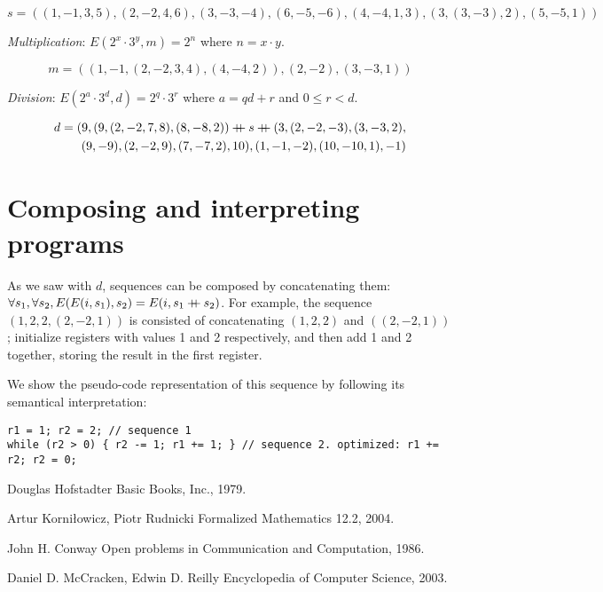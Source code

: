 \documentclass{article}
\newcommand\doubleplus{\mathbin{{+}\mspace{-8mu}{+}}}
\begin{document}
$$s = ((1, -1, 3, 5), (2, -2, 4, 6), (3, -3, -4), (6, -5, -6), (4, -4, 1, 3), (3, (3, -3), 2), (5, -5, 1))$$

\textit{Multiplication}: $E(2^x \cdot 3^y, m) = 2^n$ where $n = x \cdot y$.

$$m = ((1, -1, (2, -2, 3, 4), (4, -4, 2)), (2, -2), (3, -3, 1))$$

\textit{Division}: $E(2^a \cdot 3^d, d) = 2^q \cdot 3^r$ where $a = qd + r$ and $0 \leq r < d$.

\begin{equation*}
\begin{split}
d = (9, (9, (2, -2, 7, 8), (8, -8, 2)) \doubleplus s \doubleplus (3, (2, -2, -3), (3, -3, 2), \\
(9, -9), (2, -2, 9), (7, -7, 2), 10), (1, -1, -2), (10, -10, 1), -1)
\end{split}
\end{equation*}

\section{Composing and interpreting programs}

As we saw with $d$, sequences can be composed by concatenating them: $\forall s_1, \forall s_2, E(E(i, s_1), s_2) = E(i, s_1 \doubleplus s_2)$. For example, the sequence $(1, 2, 2, (2, -2, 1))$ is consisted of concatenating $(1, 2, 2)$ and $((2, -2, 1))$; initialize registers with values 1 and 2 respectively, and then add 1 and 2 together, storing the result in the first register.

We show the pseudo-code representation of this sequence by following its semantical interpretation:

\begin{verbatim}
r1 = 1; r2 = 2; // sequence 1
while (r2 > 0) { r2 -= 1; r1 += 1; } // sequence 2. optimized: r1 += r2; r2 = 0;
\end{verbatim}

\begin{thebibliography}{1}

Douglas Hofstadter
\newblock Basic Books, Inc., 1979.

Artur Korniłowicz, Piotr Rudnicki
\newblock Formalized Mathematics 12.2, 2004.

John H. Conway
\newblock Open problems in Communication and Computation, 1986.

Daniel D. McCracken, Edwin D. Reilly
\newblock Encyclopedia of Computer Science, 2003.

\end{thebibliography}
\end{document}
